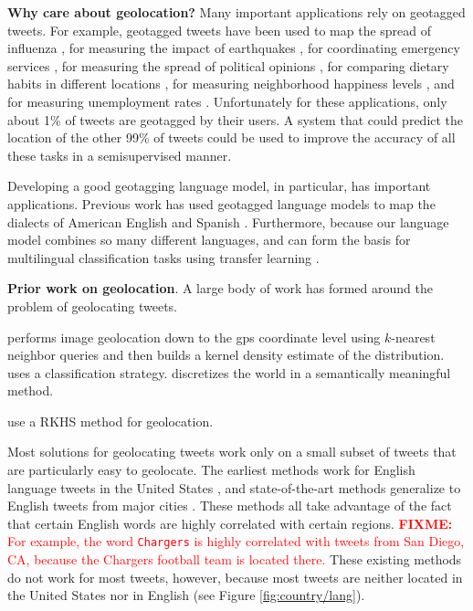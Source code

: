 \documentclass[sigconf,10pt]{acmart}
\newcommand{\str}[1]{\texttt{#1}}
\newcommand{\fixme}[1]{\textcolor{red}{\textbf{FIXME:} {#1}}}
\begin{document}
\noindent
\textbf{Why care about geolocation?}
Many important applications rely on geotagged tweets.
For example, geotagged tweets have been used to map the spread of influenza \citep{paul2014twitter,santillana2015combining},
for measuring the impact of earthquakes \citep{sakaki2010earthquake},
for coordinating emergency services \citep{klein2012detection,imran2016twitter,rudra2016summarizing,pohl2016online},
for measuring the spread of political opinions \citep{conover2011political,barbera2014birds},
for comparing dietary habits in different locations \citep{widener2014using},
for measuring neighborhood happiness levels \citep{nguyen2016leveraging}, 
and for measuring unemployment rates \citep{antenucci2014using,llorente2015social}.
Unfortunately for these applications, only about 1\% of tweets are geotagged by their users.
A system that could predict the location of the other 99\% of tweets could be used to improve the accuracy of all these tasks in a semisupervised manner.

Developing a good geotagging language model, in particular, has important applications.
Previous work has used geotagged language models to map the dialects of American English \citep{huang2016understanding,gonccalves2017fall} and Spanish \citep{gonccalves2014crowdsourcing}.
Furthermore, because our language model combines so many different languages,
and can form the basis for multilingual classification tasks using transfer learning \citep{wang2015transfer,howard2018fine}.

\noindent
\textbf{Prior work on geolocation}.
A large body of work has formed around the problem of geolocating tweets.

\citet{hays2008im2gps} performs image geolocation down to the gps coordinate level using $k$-nearest neighbor queries and then builds a kernel density estimate of the distribution.
\citet{crandall2009mapping} uses a classification strategy.
\citet{weyand2016planet} discretizes the world in a semantically meaningful method.

\citet{nguyen2017kernel} use a RKHS method for geolocation.

Most solutions for geolocating tweets work only on a small subset of tweets that are particularly easy to geolocate.
The earliest methods work for English language tweets in the United States \citep{},
and state-of-the-art methods generalize to English tweets from major cities \citep{}.
These methods all take advantage of the fact that certain English words are highly correlated with certain regions.
\fixme{For example, the word \str{Chargers} is highly correlated with tweets from San Diego, CA,
because the Chargers football team is located there.}
These existing methods do not work for most tweets, however,
because most tweets are neither located in the United States nor in English (see Figure \ref{fig:country/lang}).
\end{document}
